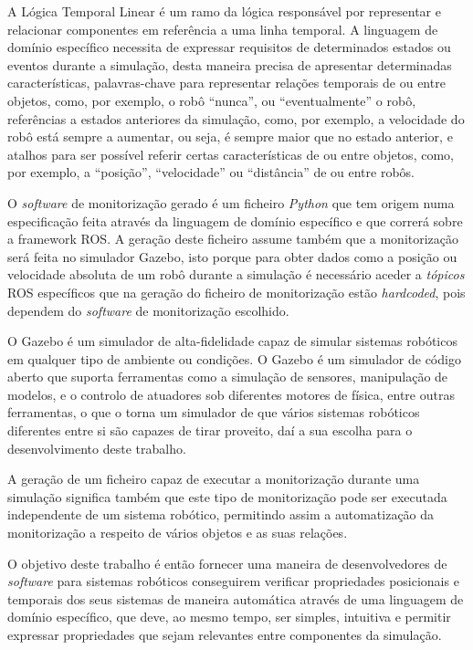 A Lógica Temporal Linear é um ramo da lógica responsável por representar e relacionar componentes em referência a uma linha temporal. A linguagem de domínio específico necessita de expressar requisitos de determinados estados ou eventos durante a simulação, desta maneira precisa de apresentar determinadas características, palavras-chave para representar relações temporais de ou entre objetos, como, por exemplo, o robô ``nunca'', ou ``eventualmente'' o robô, referências a estados anteriores da simulação, como, por exemplo, a velocidade do robô está sempre a aumentar, ou seja, é sempre maior que no estado anterior, e atalhos para ser possível referir certas características de ou entre objetos, como, por exemplo, a ``posição'', ``velocidade'' ou ``distância'' de ou entre robôs.

O \textit{software} de monitorização gerado é um ficheiro \textit{Python} que tem origem numa especificação feita através da linguagem de domínio específico e que correrá sobre a framework ROS. A geração deste ficheiro assume também que a monitorização será feita no simulador Gazebo, isto porque para obter dados como a posição ou velocidade absoluta de um robô durante a simulação é necessário aceder a \textit{tópicos} ROS específicos que na geração do ficheiro de monitorização estão \textit{hardcoded}, pois dependem do \textit{software} de monitorização escolhido. 

O Gazebo é um simulador de alta-fidelidade capaz de simular sistemas robóticos em qualquer tipo de ambiente ou condições. O Gazebo é um simulador de código aberto que suporta ferramentas como a simulação de sensores, manipulação de modelos, e o controlo de atuadores sob diferentes motores de física, entre outras ferramentas, o que o torna um simulador de que vários sistemas robóticos diferentes entre si são capazes de tirar proveito, daí a sua escolha para o desenvolvimento deste trabalho.

A geração de um ficheiro capaz de executar a monitorização durante uma simulação significa também que este tipo de monitorização pode ser executada independente de um sistema robótico, permitindo assim a automatização da monitorização a respeito de vários objetos e as suas relações.

O objetivo deste trabalho é então fornecer uma maneira de desenvolvedores de \textit{software} para sistemas robóticos conseguirem verificar propriedades posicionais e temporais dos seus sistemas de maneira automática através de uma linguagem de domínio específico, que deve, ao mesmo tempo, ser simples, intuitiva e permitir expressar propriedades que sejam relevantes entre componentes da simulação.

